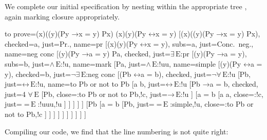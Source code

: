 \documentclass[10pt,british,a4paper,doc2]{ltxdoc}
\newcommand*{\lif}{\ensuremath{\mathbin{\rightarrow}}}
\newcommand*{\liff}{\ensuremath{\mathbin{\leftrightarrow}}}
\newcommand*{\elim}{\,\text{E}}
\begin{document}
We complete our initial specification by nesting \nyth*{} within the appropriate tree \nyth[12], again marking closure appropriately.
\begin{latexcode}
\begin{tableau}
  {
    to prove={(\exists x)((\forall y)(Py \lif x = y) \land Px) \sststile{}{} (\exists x)(\forall y)(Py \liff x = y)}
  }
  [{(\exists x)((\forall y)(Py \lif x = y) \land Px)}, checked=a, just=Pr., name=pr
    [{\lnot (\exists x)(\forall y)(Py \liff x = y)}, subs=a, just=Conc.~neg., name=neg conc
      [{(\forall y)(Py \lif a = y) \land Pa}, checked, just=$\exists\elim$:pr
        [{(\forall y)(Py \lif a = y)}, subs=b, just=$\land\elim$:!u, name=mark
          [Pa, just=$\land\elim$:!uu, name=simple
            [{\lnot (\forall y)(Py \liff a = y)}, checked=b, just=$\lnot\exists\elim$:neg conc
              [{\lnot (Pb \liff a = b)}, checked, just=$\lnot\forall\elim$:!u
                [Pb, just=$\liff\elim$:!u, name=to Pb or not to Pb
                 [a \neq b, just=$\liff\elim$:!u
                  [{Pb \lif a = b}, checked, just=4 $\forall\elim$
                      [\lnot Pb, close={:to Pb or not to Pb,!c}, just=$\lif\elim$:!u
                      ]
                      [{a = b}
                        [a \neq a, close={:!c}, just={$=\elim$:{!uuu,!u}}
                        ]
                      ]
                  ]
                ]
                ]
                [\lnot Pb
                 [{a = b}
                    [Pb, just={$=\elim$:{simple,!u}}, close={:to Pb or not to Pb,!c}
                    ]
                 ]
                ]
              ]
            ]
          ]
        ]
      ]
    ]
  ]
\end{tableau}
\end{latexcode}

Compiling our code, we find that the line numbering is not quite right:
\end{document}
